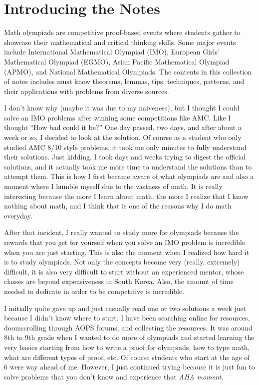 \documentclass[../../main.tex]{subfiles}
\begin{document}
\chapter*{Introducing the Notes}

Math olympiads are competitive proof-based events where students
gather to showcase their mathematical and critical thinking skills.
Some major events include International Mathematical Olympiad (IMO),
European Girls' Mathematical Olympiad (EGMO), Asian Pacific
Mathematical Olympiad (APMO), and National Mathematical Olympiads.
The contents in this collection of notes includes must know
theorems, lemmas, tips, techniques, patterns, and their applications
with problems from diverse sources.

I don't know why (maybe it was due to my naiveness), but I thought
I could solve an IMO problems after winning some competitions
like AMC. Like I thought ``How bad could it be?'' One day passed,
two days, and after about a week or so, I decided to look at the
solution. Of course as a student who only studied AMC 8/10 style
problems, it took me only minutes to fully understand their solutions.
Just kidding, I took days and weeks trying to digest the official
solutions, and it actually took me more time to understand the
solutions than to attempt them. This is how I first became aware of
what olympiads are and also a moment where I humble myself due to
the vastness of math. It is really interesting because the more I
learn about math, the more I realize that I know nothing about math,
and I think that is one of the reasons why I do math everyday.

After that incident, I really wanted to study more for olympiads
because the rewards that you get for yourself when you solve an
IMO problem is incredible when you are just starting. This is also
the moment when I realized how hard it is to study olympiads.
Not only the concepts become very (really, extremely) difficult,
it is also very difficult to start without an experienced mentor,
whose classes are beyond expensiveness in South Korea. Also,
the amount of time needed to dedicate in order to be competitive
is incredible.

I initially quite gave up and just casually read one or two solutions
a week just because I didn't know where to start. I have been
searching online for resources, doomscrolling through AOPS forums,
and collecting the resources. It was around 8th to 9th grade when I
wanted to do more of olympiads and started learning the very basics
starting from how to write a proof for olympiads, how to type math,
what are different types of proof, etc. Of course students who start
at the age of 6 were way ahead of me. However, I just continued trying
because it is just fun to solve problems that you don't know and
experience that \textit{AHA moment}.
\end{document}

